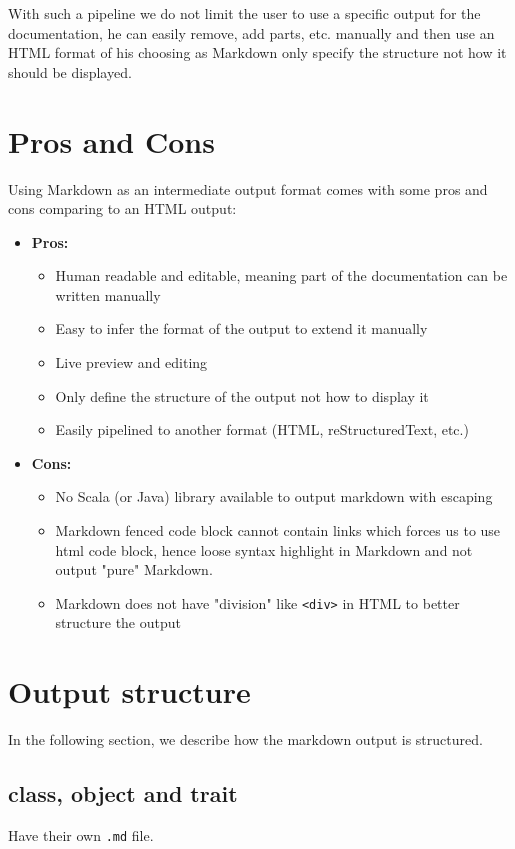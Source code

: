 \documentclass{report}
\begin{document}
With such a pipeline we do not limit the user to use a specific output for the documentation, he can easily remove, add parts, etc. manually and then use an HTML format of his choosing as Markdown only specify the structure not how it should be displayed.

\section{Pros and Cons}
\label{sec:proscons}
Using Markdown as an intermediate output format comes with some pros and cons comparing to an HTML output:
\begin{itemize}
    \item \textbf{Pros:}
    \begin{itemize}
        \item Human readable and editable, meaning part of the documentation can be written manually
        \item Easy to infer the format of the output to extend it manually
        \item Live preview and editing
        \item Only define the structure of the output not how to display it
        \item Easily pipelined to another format (HTML, reStructuredText, etc.)
    \end{itemize}
    \item \textbf{Cons:}
    \begin{itemize}
        \item No Scala (or Java) library available to output markdown with escaping
        \item Markdown fenced code block cannot contain links which forces us to use html code block, hence loose syntax highlight in Markdown and not output "pure" Markdown.
        \item Markdown does not have "division" like \texttt{<div>} in HTML to better structure the output
    \end{itemize}
\end{itemize}

\section{Output structure}
In the following section, we describe how the markdown output is structured.

\subsection{class, object and trait}
Have their own \texttt{.md} file.
\end{document}

